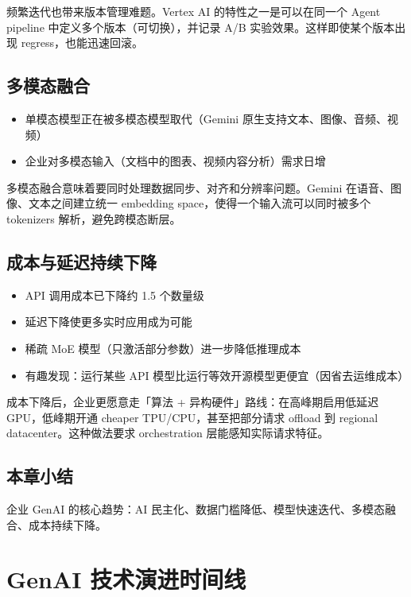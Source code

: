 \documentclass[a4paper]{article}
\begin{document}
频繁迭代也带来版本管理难题。Vertex AI 的特性之一是可以在同一个 Agent pipeline 中定义多个版本（可切换），并记录 A/B 实验效果。这样即使某个版本出现 regress，也能迅速回滚。

\subsection{多模态融合}

\begin{itemize}
    \item 单模态模型正在被多模态模型取代（Gemini 原生支持文本、图像、音频、视频）
    \item 企业对多模态输入（文档中的图表、视频内容分析）需求日增
\end{itemize}

多模态融合意味着要同时处理数据同步、对齐和分辨率问题。Gemini 在语音、图像、文本之间建立统一 embedding space，使得一个输入流可以同时被多个 tokenizers 解析，避免跨模态断层。

\subsection{成本与延迟持续下降}

\begin{itemize}
    \item API 调用成本已下降约 1.5 个数量级
    \item 延迟下降使更多实时应用成为可能
    \item 稀疏 MoE 模型（只激活部分参数）进一步降低推理成本
    \item 有趣发现：运行某些 API 模型比运行等效开源模型更便宜（因省去运维成本）
\end{itemize}

成本下降后，企业更愿意走「算法 + 异构硬件」路线：在高峰期启用低延迟 GPU，低峰期开通 cheaper TPU/CPU，甚至把部分请求 offload 到 regional datacenter。这种做法要求 orchestration 层能感知实际请求特征。

\subsection{本章小结}

企业 GenAI 的核心趋势：AI 民主化、数据门槛降低、模型快速迭代、多模态融合、成本持续下降。

\section{GenAI 技术演进时间线}
\end{document}

